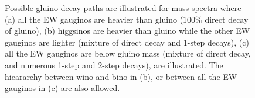 \begin{figure}[h]
  \centering
    \caption{ 
Possible gluino decay paths are illustrated for mass spectra where
(a) all the EW gauginos are heavier than gluino ($100\%$ direct decay of gluino),
(b) higgsinos are heavier than gluino while the other EW gauginos are lighter (mixture of direct decay and 1-step decays),
(c) all the EW gauginos are below gluino mass (mixture of direct decay, and numerous 1-step and 2-step decays),
are illustrated.
The hieararchy between wino and bino in (b), or between all the EW gauginos in (c) are also allowed.
\label{fig::Introduction::signal_massConfig} }
\end{figure}

